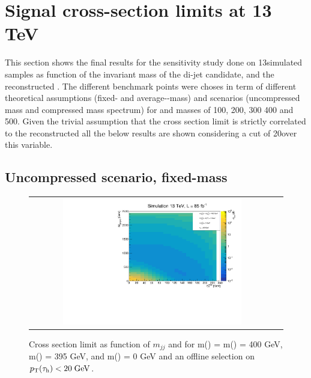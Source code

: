 \clearpage

\section{Signal cross-section limits at 13 TeV}
\label{sec::xseclim_results}

This section shows the final results for the sensitivity study done on 13\tev simulated samples as function of the invariant mass of the di-jet candidate,  \met and the reconstructed \hadtau \pt. The different benchmark points were choses in term of different theoretical assumptions (fixed- and average-\stau-mass) and scenarios (uncompressed mass and compressed mass spectrum) for \charginopm and \neutralinoone masses of 100, 200, 300 400 and 500\gev. Given the trivial assumption that the cross section limit is strictly correlated to the reconstructed \hadtau \pt all the below results are shown considering a cut of 20\gev over this variable.

\subsection*{Uncompressed scenario, fixed-\stau mass}

\FloatBarrier


\begin{figure}[tbh!]
	\centering
	\begin{tabular}{cc}
		\includegraphics[width=0.75\textwidth]{analysis/pics/JetInvMass_vs_MET_xseclim_Chargino400_Stau395_LSP000_taupt20.pdf}
	\end{tabular}
	\caption{Cross section limit as function of $m_{jj}$ and \met for m(\charginopm) = m(\neutralinotwo) = 400 GeV,  m(\stau) = 395 GeV, and m(\neutralinoone) = 0 GeV and an offline selection on $p_{\text{T}}(\tau_{\text{h}}) <  20\;\text{Ge}\kern-0.06667em\text{V}$.}
	\label{fig::JetInvMass_vs_MET_xseclim_Chargino400_Stau395_LSP000_taupt20}
\end{figure}

